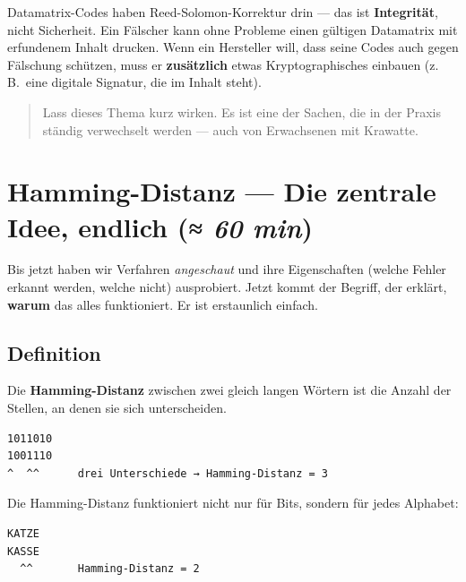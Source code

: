 Datamatrix-Codes haben Reed-Solomon-Korrektur drin — das ist
\textbf{Integrität}, nicht Sicherheit. Ein Fälscher kann ohne Probleme
einen gültigen Datamatrix mit erfundenem Inhalt drucken. Wenn ein
Hersteller will, dass seine Codes auch gegen Fälschung schützen, muss
er \textbf{zusätzlich} etwas Kryptographisches einbauen (z.\,B.\ eine
digitale Signatur, die im Inhalt steht).

\begin{quote}
Lass dieses Thema kurz wirken. Es ist eine der Sachen, die in der
Praxis ständig verwechselt werden — auch von Erwachsenen mit Krawatte.
\end{quote}

\section{Hamming-Distanz — Die zentrale Idee, endlich \normalfont(\textit{≈ 60 min})}

Bis jetzt haben wir Verfahren \emph{angeschaut} und ihre Eigenschaften
(welche Fehler erkannt werden, welche nicht) ausprobiert. Jetzt kommt
der Begriff, der erklärt, \textbf{warum} das alles funktioniert. Er
ist erstaunlich einfach.

\subsection*{Definition}

Die \textbf{Hamming-Distanz} zwischen zwei gleich langen Wörtern ist
die Anzahl der Stellen, an denen sie sich unterscheiden.

\begin{verbatim}
1011010
1001110
^  ^^      drei Unterschiede → Hamming-Distanz = 3
\end{verbatim}

Die Hamming-Distanz funktioniert nicht nur für Bits, sondern für jedes
Alphabet:

\begin{verbatim}
KATZE
KASSE
  ^^       Hamming-Distanz = 2
\end{verbatim}

